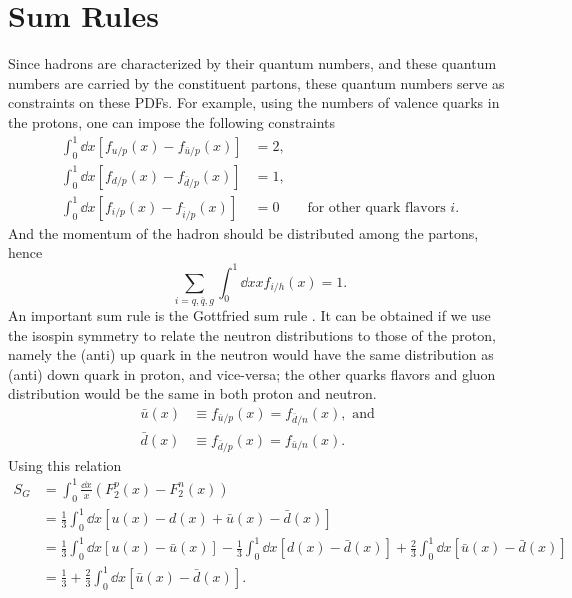 \documentclass[../main.tex]{subfiles}
\begin{document}
\section{Sum Rules}
\label{sec:sum_rules}
Since hadrons are characterized by their quantum numbers, and these quantum numbers
are carried by the constituent partons, these quantum numbers serve as constraints
on these PDFs. For example, using the numbers of valence quarks in the protons,
one can impose the following constraints
\begin{equation}
	\begin{split}
		\int_{0}^{1} \dd{x} \left[f_{u/p} \left(x\right)-f_{\bar{u}/p} \left(x\right)\right]&=2,\\
		\int_{0}^{1} \dd{x} \left[f_{d/p} \left(x\right)-f_{\bar{d}/p} \left(x\right)\right]&=1,\\
		\int_{0}^{1} \dd{x} \left[f_{i/p} \left(x\right)-f_{\bar{i}/p} \left(x\right)\right]&=0 \qquad \text{for other quark flavors } i.
	\end{split}
\end{equation}
And the momentum of the hadron should be distributed among the partons, hence
\begin{equation}
	\sum_{i=q,\bar{q},g}\int_{0}^{1} \dd{x} xf_{i/h}\left(x\right)=1.
\end{equation}
An important sum rule is the Gottfried sum rule \cite{gottfried1967}. It can be obtained
if we use the isospin symmetry to relate the neutron distributions to those of
the proton, namely the (anti) up quark in the neutron would have the same distribution
as (anti) down quark in proton, and vice-versa; the other quarks flavors and gluon
distribution would be the same in both proton and neutron.
\begin{equation}
	\begin{split}
		\bar{u}(x) &\equiv f_{\bar{u}/p}(x) = f_{\bar{d}/n}(x),\text{ and }\\
		\bar{d}(x) &\equiv f_{\bar{d}/p}(x) = f_{\bar{u}/n}(x).
	\end{split}
\end{equation}
Using this relation
\begin{equation}
	\begin{split}
		S_G & = \int_0^1 \frac{\dd{x}}{x}\left(F_2^{p}(x) - F_{2}^{n}(x)\right)\\
		& = \frac{1}{3} \int_0^1 \dd{x} \left[u\left(x\right) - d\left(x\right)
			+ \bar{u}\left(x\right) - \bar{d}\left(x\right)\right]\\
		& = \frac{1}{3} \int_0^1 \dd{x} \left[u\left(x\right) - \bar{u}\left(x\right)\right]
		- \frac{1}{3} \int_0^1 \dd{x} \left[d\left(x\right) - \bar{d}\left(x\right)\right]
		+ \frac{2}{3} \int_0^1 \dd{x} \left[\bar{u}\left(x\right)-\bar{d}\left(x\right)\right]\\
		& = \frac{1}{3} + \frac{2}{3} \int_0^1 \dd{x} \left[\bar{u}\left(x\right)-\bar{d}\left(x\right)\right].
	\end{split}
\end{equation}
\end{document}
